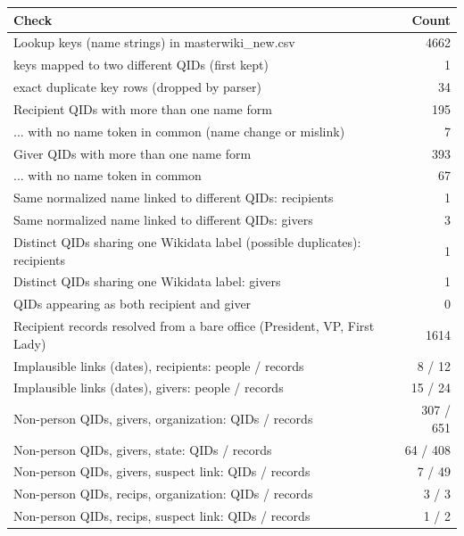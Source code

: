 \begin{tabular}{lr}
\toprule
Check & Count \\
\midrule
Lookup keys (name strings) in masterwiki\_new.csv & 4662 \\
  keys mapped to two different QIDs (first kept) & 1 \\
  exact duplicate key rows (dropped by parser) & 34 \\
Recipient QIDs with more than one name form & 195 \\
  ... with no name token in common (name change or mislink) & 7 \\
Giver QIDs with more than one name form & 393 \\
  ... with no name token in common & 67 \\
Same normalized name linked to different QIDs: recipients & 1 \\
Same normalized name linked to different QIDs: givers & 3 \\
Distinct QIDs sharing one Wikidata label (possible duplicates): recipients & 1 \\
Distinct QIDs sharing one Wikidata label: givers & 1 \\
QIDs appearing as both recipient and giver & 0 \\
Recipient records resolved from a bare office (President, VP, First Lady) & 1614 \\
Implausible links (dates), recipients: people / records & 8 / 12 \\
Implausible links (dates), givers: people / records & 15 / 24 \\
Non-person QIDs, givers, organization: QIDs / records & 307 / 651 \\
Non-person QIDs, givers, state: QIDs / records & 64 / 408 \\
Non-person QIDs, givers, suspect link: QIDs / records & 7 / 49 \\
Non-person QIDs, recips, organization: QIDs / records & 3 / 3 \\
Non-person QIDs, recips, suspect link: QIDs / records & 1 / 2 \\
\bottomrule
\end{tabular}
\par{}
